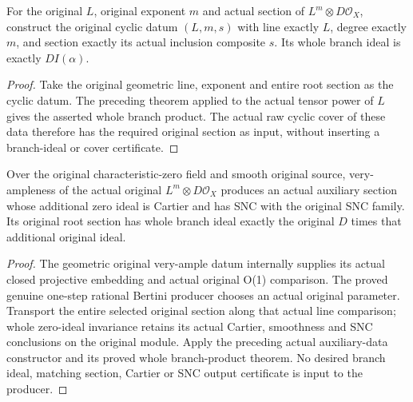 \begin{definition}
\label{def:kn-nadel-auxiliary-branch-section-data}
\leanok
{}
For the original $L$, original exponent $m$ and actual section of
$L^m\otimes D\mathcal O_X$, construct the original cyclic datum $(L,m,s)$ with line exactly $L$,
degree exactly $m$, and section exactly its actual inclusion composite $s$. Its whole branch ideal is exactly $D I(\alpha)$.
\end{definition}
\begin{proof}
Take the original geometric line, exponent and entire root section as
the cyclic datum. The preceding theorem applied to the actual tensor power of $L$ gives
the asserted whole branch product. The actual raw cyclic cover of these
data therefore has the required original section as input, without
inserting a branch-ideal or cover certificate.
\end{proof}

\begin{theorem}
\label{thm:kn-nadel-very-ample-auxiliary-branch-section}
\leanok
{}
Over the original characteristic-zero field and smooth original source,
very-ampleness of the actual original $L^m\otimes D\mathcal O_X$
produces an actual auxiliary section whose additional zero ideal is
Cartier and has SNC with the original SNC family. Its original root
section has whole branch ideal exactly the original $D$ times that
additional original ideal.
\end{theorem}
\begin{proof}
The geometric original very-ample datum internally supplies its actual
closed projective embedding and actual original O(1) comparison. The
proved genuine one-step rational Bertini producer chooses an actual
original parameter. Transport the entire selected original section along
that actual line comparison; whole zero-ideal invariance retains its
actual Cartier, smoothness and SNC conclusions on the original module.
Apply the preceding actual auxiliary-data constructor and its proved
whole branch-product theorem. No desired branch ideal, matching section,
Cartier or SNC output certificate is input to the producer.
\end{proof}


